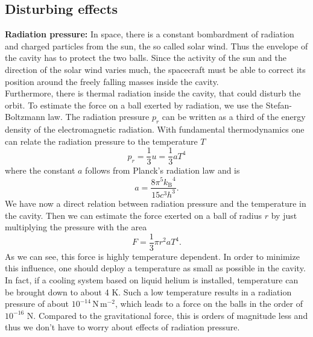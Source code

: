 \documentclass[prb,preprint]{revtex4-1}
\begin{document}
\subsection{Disturbing effects}

\textbf{Radiation pressure:} In space, there is a constant bombardment of radiation and charged particles from the sun, the so called solar wind. Thus the envelope of the cavity has to protect the two balls. Since the activity of the sun and the direction of the solar wind varies much, the spacecraft must be able to correct its position around the freely falling masses inside the cavity.\\
Furthermore, there is thermal radiation inside the cavity, that could disturb the orbit. To estimate the force on a ball exerted by radiation, we use the Stefan-Boltzmann law. The radiation pressure $p_r$ can be written as a third of the energy density of the electromagnetic radiation. With fundamental thermodynamics one can relate the radiation pressure to the temperature $T$
\begin{equation}
\label{Stefan-Boltzmann}
p_r = \frac{1}{3} u = \frac{1}{3} a T^4
\end{equation}
where the constant $a$ follows from Planck's radiation law and is
\begin{equation}
\label{eq:a}
a = \frac{8 \pi^5 {k_\mathrm{B}}^4}{15 c^3 h^3}.
\end{equation}
We have now a direct relation between radiation pressure and the temperature in the cavity. Then we can estimate the force exerted on a ball of radius $r$ by just multiplying the pressure with the area
\begin{equation}
F = \frac{1}{3} \pi r^2 a T^4.
\end{equation}
As we can see, this force is highly temperature dependent. In order to minimize this influence, one should deploy a temperature as small as possible in the cavity. In fact, if a cooling system based on liquid helium is installed, temperature can be brought down to about 4 K. Such a low temperature results in a radiation pressure of about $10^{-14} \, \mathrm{N} \, \mathrm{m}^{-2}$, which leads to a force on the balls in the order of $10^{-16}$ N. Compared to the gravitational force, this is orders of magnitude less and thus we don't have to worry about effects of radiation pressure.\\
\end{document}
